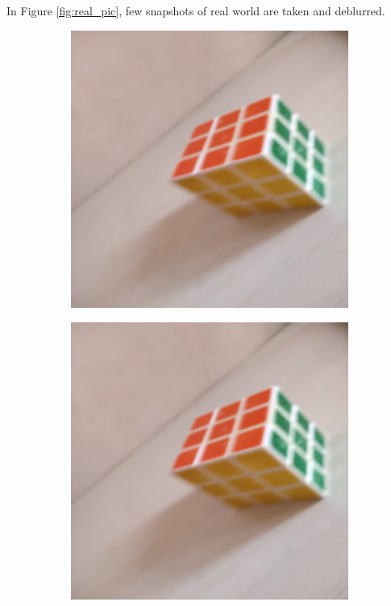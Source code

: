 \documentclass[10pt,twocolumn,letterpaper]{article}
\begin{document}
\newpage
In Figure \ref{fig:real_pic}, few snapshots of real world are taken and deblurred.
\begin{figure}[h]
  \centering
  \begin{subfigure}{.5\columnwidth}
    \centering
    \includegraphics[width=\linewidth]{images/rubiks.png}
  \end{subfigure}%
  \hfill
  \begin{subfigure}{.5\columnwidth}
    \centering
    \includegraphics[width=\linewidth]{images/rubiks _db.png}
  \end{subfigure}%
  \hfill
\end{figure}
\end{document}
